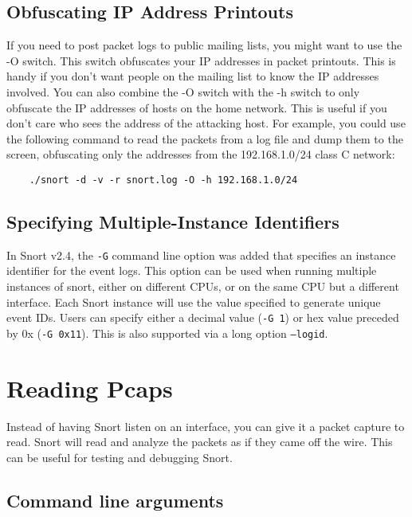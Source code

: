 \documentclass[english]{report}
\begin{document}
\subsection{Obfuscating IP Address Printouts}

If you need to post packet logs to public mailing lists, you might want to use
the -O switch. This switch obfuscates your IP addresses in packet printouts.
This is handy if you don't want people on the mailing list to know the IP
addresses involved. You can also combine the -O switch with the -h switch to
only obfuscate the IP addresses of hosts on the home network.  This is useful
if you don't care who sees the address of the attacking host.  For example, you
could use the following command to read the packets from a log file and dump
them to the screen, obfuscating only the addresses from the 192.168.1.0/24
class C network:
 
\begin{verbatim}
    ./snort -d -v -r snort.log -O -h 192.168.1.0/24
\end{verbatim}

\subsection{Specifying Multiple-Instance Identifiers}

In Snort v2.4, the \texttt{-G} command line option was added that specifies an
instance identifier for the event logs.  This option can be used when running
multiple instances of snort, either on different CPUs, or on the same CPU but a
different interface.  Each Snort instance will use the value specified to
generate unique event IDs.  Users can specify either a decimal value
(\texttt{-G 1}) or hex value preceded by 0x (\texttt{-G 0x11}).  This is also
supported via a long option \texttt{--logid}.

\section{Reading Pcaps}

Instead of having Snort listen on an interface, you can give it a packet
capture to read.  Snort will read and analyze the packets as if they came off
the wire.  This can be useful for testing and debugging Snort.

\subsection{Command line arguments}
\end{document}
